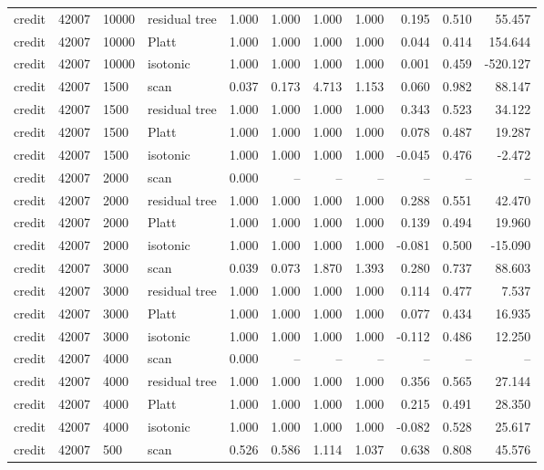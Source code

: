 \begin{tabular}{lrllrrrrrrr}
credit & 42007 & 10000 & residual tree & 1.000 & 1.000 & 1.000 & 1.000 & 0.195 & 0.510 & 55.457 \\
credit & 42007 & 10000 & Platt & 1.000 & 1.000 & 1.000 & 1.000 & 0.044 & 0.414 & 154.644 \\
credit & 42007 & 10000 & isotonic & 1.000 & 1.000 & 1.000 & 1.000 & 0.001 & 0.459 & -520.127 \\
credit & 42007 & 1500 & scan & 0.037 & 0.173 & 4.713 & 1.153 & 0.060 & 0.982 & 88.147 \\
credit & 42007 & 1500 & residual tree & 1.000 & 1.000 & 1.000 & 1.000 & 0.343 & 0.523 & 34.122 \\
credit & 42007 & 1500 & Platt & 1.000 & 1.000 & 1.000 & 1.000 & 0.078 & 0.487 & 19.287 \\
credit & 42007 & 1500 & isotonic & 1.000 & 1.000 & 1.000 & 1.000 & -0.045 & 0.476 & -2.472 \\
credit & 42007 & 2000 & scan & 0.000 & -- & -- & -- & -- & -- & -- \\
credit & 42007 & 2000 & residual tree & 1.000 & 1.000 & 1.000 & 1.000 & 0.288 & 0.551 & 42.470 \\
credit & 42007 & 2000 & Platt & 1.000 & 1.000 & 1.000 & 1.000 & 0.139 & 0.494 & 19.960 \\
credit & 42007 & 2000 & isotonic & 1.000 & 1.000 & 1.000 & 1.000 & -0.081 & 0.500 & -15.090 \\
credit & 42007 & 3000 & scan & 0.039 & 0.073 & 1.870 & 1.393 & 0.280 & 0.737 & 88.603 \\
credit & 42007 & 3000 & residual tree & 1.000 & 1.000 & 1.000 & 1.000 & 0.114 & 0.477 & 7.537 \\
credit & 42007 & 3000 & Platt & 1.000 & 1.000 & 1.000 & 1.000 & 0.077 & 0.434 & 16.935 \\
credit & 42007 & 3000 & isotonic & 1.000 & 1.000 & 1.000 & 1.000 & -0.112 & 0.486 & 12.250 \\
credit & 42007 & 4000 & scan & 0.000 & -- & -- & -- & -- & -- & -- \\
credit & 42007 & 4000 & residual tree & 1.000 & 1.000 & 1.000 & 1.000 & 0.356 & 0.565 & 27.144 \\
credit & 42007 & 4000 & Platt & 1.000 & 1.000 & 1.000 & 1.000 & 0.215 & 0.491 & 28.350 \\
credit & 42007 & 4000 & isotonic & 1.000 & 1.000 & 1.000 & 1.000 & -0.082 & 0.528 & 25.617 \\
credit & 42007 & 500 & scan & 0.526 & 0.586 & 1.114 & 1.037 & 0.638 & 0.808 & 45.576 \\

\end{tabular}
